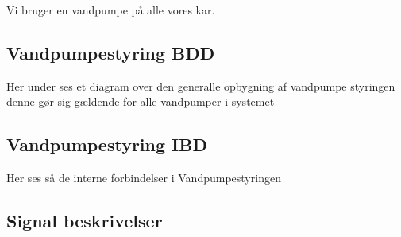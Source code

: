 
Vi bruger en vandpumpe på alle vores kar.

\subsection{Vandpumpestyring BDD}
Her under ses et diagram over den generalle opbygning af vandpumpe styringen denne gør sig gældende for alle vandpumper i systemet


\subsection{Vandpumpestyring IBD}
Her ses så de interne forbindelser i Vandpumpestyringen 


\subsection{Signal beskrivelser}
